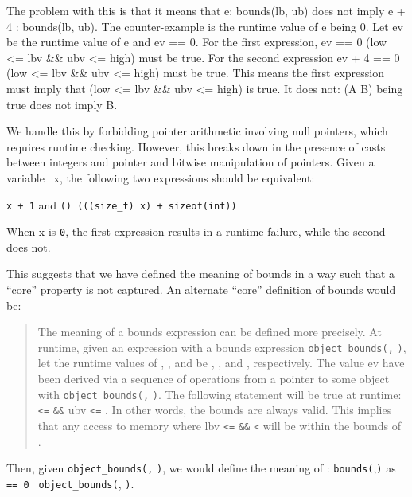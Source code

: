 The problem with this is that it means that e: bounds(lb, ub) does not
imply e + 4 : bounds(lb, ub). The counter-example is the runtime value
of e being 0. Let ev be the runtime value of e and ev == 0. For the
first expression, ev == 0 \textbar{}\textbar{} (low <= lbv
\&\& ubv <= high) must be true. For the second expression ev +
4 == 0 \textbar{}\textbar{} (low <= lbv \&\& ubv <=
high) must be true. This means the first expression must imply that (low
<= lbv \&\& ubv <= high) is true. It does not: (A
\textbar{}\textbar{} B) being true does not imply B.

We handle this by forbidding pointer arithmetic involving null pointers,
which requires runtime checking. However, this breaks down in the
presence of casts between integers and pointer and bitwise manipulation
of pointers. Given a variable \arrayptrint\ x,
the following two expressions should be equivalent:

\texttt{x + 1} and \texttt{(\arrayptrint) (((size\_t) x) + sizeof(int))}

When x is \texttt{0}, the first expression results in a runtime failure,
while the second does not.

This suggests that we have defined the meaning of bounds in a way such
that a ``core'' property is not captured. An alternate ``core''
definition of bounds would be:

\begin{quote}
The meaning of a bounds expression can be defined more precisely. At
runtime, given an expression  with a bounds expression
\texttt{object\_bounds(}\texttt{,} \texttt{)}, let the
runtime values of , , and  be ,
, and , respectively. The value ev have been derived
via a sequence of operations from a pointer to some object 
with \texttt{object\_bounds(}\texttt{,} \texttt{)}.
The following statement will be true at runtime: 
\texttt{<=}  \texttt{\&\&} ubv \texttt{<=}
. In other words, the bounds are always valid. This implies
that any access to memory where lbv \texttt{<=} 
\texttt{\&\&}  \texttt{<}  will be within
the bounds of .
\end{quote}

Then, given \texttt{object\_bounds(}\texttt{,}
\texttt{)}, we would define the meaning of  :
\texttt{bounds(},\texttt{)} as  \texttt{== 0
\textbar{}\textbar{}} \texttt{object\_bounds(},
\texttt{)}.

